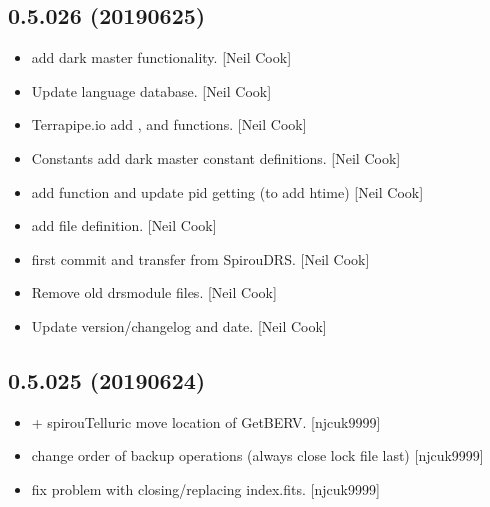 \documentclass[a4paper,10pt,english]{report}
\begin{document}
\subsection{0.5.026 (2019\sphinxhyphen{}06\sphinxhyphen{}25)}
\label{\detokenize{misc/changelog:id130}}\begin{itemize}
\item {} 
 \sphinxhyphen{} add dark master functionality. {[}Neil Cook{]}

\item {} 
Update language database. {[}Neil Cook{]}

\item {} 
Terrapipe.io \sphinxhyphen{} add ,  and 
functions. {[}Neil Cook{]}

\item {} 
Constants \sphinxhyphen{} add dark master constant definitions. {[}Neil Cook{]}

\item {} 
 \sphinxhyphen{} add function  and update pid
getting (to add htime) {[}Neil Cook{]}

\item {} 
 \sphinxhyphen{} add  file definition. {[}Neil Cook{]}

\item {} 
 \sphinxhyphen{} first commit and transfer from SpirouDRS.
{[}Neil Cook{]}

\item {} 
Remove old drsmodule files. {[}Neil Cook{]}

\item {} 
Update version/changelog and date. {[}Neil Cook{]}

\end{itemize}


\subsection{0.5.025 (2019\sphinxhyphen{}06\sphinxhyphen{}24)}
\label{\detokenize{misc/changelog:id131}}\begin{itemize}
\item {} 
 + spirouTelluric \sphinxhyphen{} move location of GetBERV.
{[}njcuk9999{]}

\item {} 
 \sphinxhyphen{} change order of backup operations (always close lock
file last) {[}njcuk9999{]}

\item {} 
 \sphinxhyphen{} fix problem with closing/replacing index.fits.
{[}njcuk9999{]}

\end{itemize}
\end{document}
